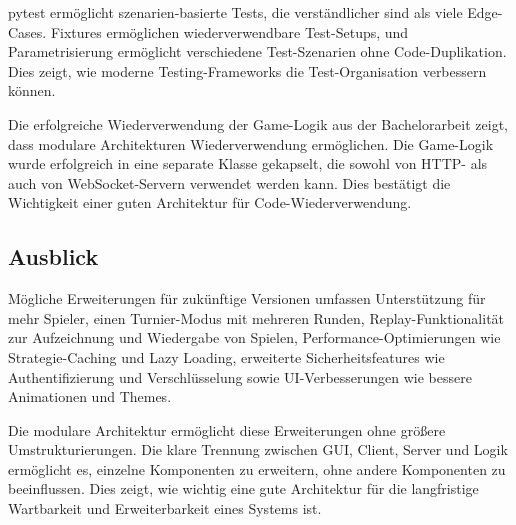 pytest ermöglicht szenarien-basierte Tests, die verständlicher sind als viele Edge-Cases.
Fixtures ermöglichen wiederverwendbare Test-Setups, und Parametrisierung ermöglicht verschiedene Test-Szenarien ohne Code-Duplikation.
Dies zeigt, wie moderne Testing-Frameworks die Test-Organisation verbessern können.

Die erfolgreiche Wiederverwendung der Game-Logik aus der Bachelorarbeit zeigt, dass modulare Architekturen Wiederverwendung ermöglichen.
Die Game-Logik wurde erfolgreich in eine separate Klasse gekapselt, die sowohl von HTTP- als auch von WebSocket-Servern verwendet werden kann.
Dies bestätigt die Wichtigkeit einer guten Architektur für Code-Wiederverwendung.

\subsection{Ausblick}

Mögliche Erweiterungen für zukünftige Versionen umfassen Unterstützung für mehr Spieler, einen Turnier-Modus mit mehreren Runden, Replay-Funktionalität zur Aufzeichnung und Wiedergabe von Spielen, Performance-Optimierungen wie Strategie-Caching und Lazy Loading, erweiterte Sicherheitsfeatures wie Authentifizierung und Verschlüsselung sowie UI-Verbesserungen wie bessere Animationen und Themes.

Die modulare Architektur ermöglicht diese Erweiterungen ohne größere Umstrukturierungen.
Die klare Trennung zwischen GUI, Client, Server und Logik ermöglicht es, einzelne Komponenten zu erweitern, ohne andere Komponenten zu beeinflussen.
Dies zeigt, wie wichtig eine gute Architektur für die langfristige Wartbarkeit und Erweiterbarkeit eines Systems ist.
